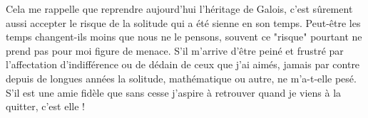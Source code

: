 Cela me rappelle que reprendre aujourd'hui l'héritage de Galois, c'est sûrement aussi accepter le risque de la solitude qui a été sienne en son temps. Peut-être les temps changent-ils moins que nous ne le pensons, souvent ce "risque" pourtant ne prend pas pour moi figure de menace. S'il m'arrive d'être peiné et frustré par l'affectation d'indifférence ou de dédain de ceux que j'ai aimés, jamais par contre depuis de longues années la solitude, mathématique ou autre, ne m'a-t-elle pesé. S'il est une amie fidèle que sans cesse j'aspire à retrouver quand je viens à la quitter, c'est elle !
